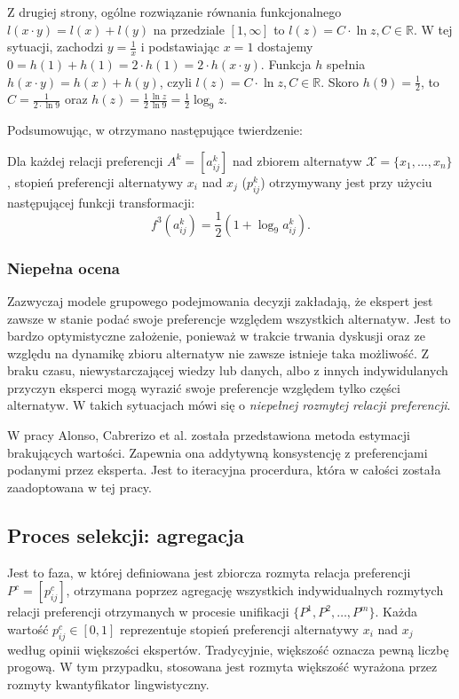 Z drugiej strony, ogólne rozwiązanie równania funkcjonalnego $l(x \cdot y) =
l(x) + l(y)$ na przedziale $[1, \infty]$ to $l(z) = C \cdot \ln z, C \in
\mathbb{R}.$
W tej sytuacji, zachodzi $y = \frac{1}{x}$ i podstawiając $x = 1$ dostajemy $0
= h(1) + h(1) = 2 \cdot h(1) = 2 \cdot h(x \cdot y).$ Funkcja $h$ spełnia
$h(x \cdot y) = h(x) + h(y)$, czyli $l(z) = C \cdot \ln z, C \in \mathbb{R}.$
Skoro $h(9) = \frac{1}{2}$, to $C = \frac{1}{2 \cdot \ln 9}$ oraz $h(z) =
\frac{1}{2} \frac{\ln z}{\ln 9} = \frac{1}{2} \log_9 z.$

Podsumowując, w \cite{Chiclana1996} otrzymano następujące twierdzenie:
\begin{theorem}
Dla każdej relacji preferencji $A^k = [a^k_{ij}]$ nad zbiorem alternatyw
$\mathcal{X} = \{x_1,\dotsc,x_n\}$, stopień preferencji alternatywy $x_i$ nad
$x_j$ ($p^k_{ij}$) otrzymywany jest przy użyciu następującej funkcji
transformacji:
\begin{equation}
f^3(a^k_{ij}) = \frac{1}{2}(1 + \log_9 a^k_{ij}).
\end{equation}
\end{theorem}

\subsubsection{Niepełna ocena}
Zazwyczaj modele grupowego podejmowania decyzji zakładają, że ekspert jest
zawsze w stanie podać swoje preferencje względem wszystkich alternatyw. Jest to
bardzo optymistyczne założenie, ponieważ w trakcie trwania dyskusji oraz ze
względu na dynamikę zbioru alternatyw nie zawsze istnieje taka możliwość. Z
braku czasu, niewystarczającej wiedzy lub danych, albo z innych indywidulanych
przyczyn eksperci mogą wyrazić swoje preferencje względem tylko części
alternatyw. W takich sytuacjach mówi się o \emph{niepełnej rozmytej relacji
preferencji}.

W pracy Alonso, Cabrerizo et al. \cite{Alonso2009} została przedstawiona metoda
estymacji brakujących wartości. Zapewnia ona addytywną konsystencję z
preferencjami podanymi przez eksperta. Jest to iteracyjna procerdura, która w
całości została zaadoptowana w tej pracy.

\subsection{Proces selekcji: agregacja}
Jest to faza, w której definiowana jest zbiorcza rozmyta relacja preferencji
$P^c = [p^c_{ij}]$, otrzymana poprzez agregację wszystkich indywidualnych
rozmytych relacji preferencji otrzymanych w procesie unifikacji $\{ P^1, P^2,
\dotsc, P^m \}$. Każda wartość $p^c_{ij} \in [0,1]$ reprezentuje stopień
preferencji alternatywy $x_i$ nad $x_j$ według opinii większości ekspertów.
Tradycyjnie, większość oznacza pewną liczbę progową. W tym przypadku, stosowana
jest rozmyta większość wyrażona przez rozmyty kwantyfikator lingwistyczny.

